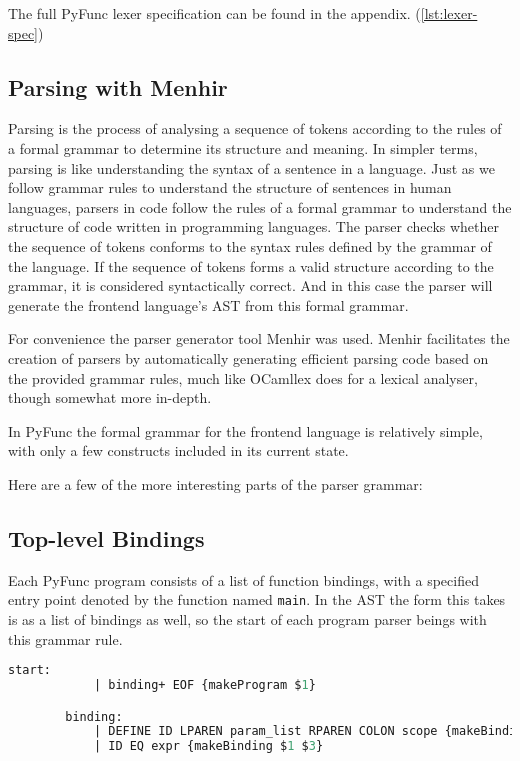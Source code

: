 \documentclass{l4proj}
\begin{document}
The full PyFunc lexer specification can be found in the appendix. (\ref{lst:lexer-spec})


\subsection{Parsing with Menhir}

Parsing is the process of analysing a sequence of tokens according to the rules of a formal grammar to determine its structure and meaning.
In simpler terms, parsing is like understanding the syntax of a sentence in a language.
Just as we follow grammar rules to understand the structure of sentences in human languages, parsers in code follow the rules of a formal grammar to understand the structure of code written in programming languages.
The parser checks whether the sequence of tokens conforms to the syntax rules defined by the grammar of the language.
If the sequence of tokens forms a valid structure according to the grammar, it is considered syntactically correct.
And in this case the parser will generate the frontend language's AST from this formal grammar.

For convenience the parser generator tool Menhir was used.
Menhir facilitates the creation of parsers by automatically generating efficient parsing code based on the provided grammar rules, much like OCamllex does for a lexical analyser, though somewhat more in-depth.

In PyFunc the formal grammar for the frontend language is relatively simple, with only a few constructs included in its current state.

Here are a few of the more interesting parts of the parser grammar:

\subsection*{Top-level Bindings}
    
    Each PyFunc program consists of a list of function bindings, with a specified entry point denoted by the function named \texttt{main}.
    In the AST the form this takes is as a list of bindings as well, so the start of each program parser beings with this grammar rule.

    \begin{lstlisting}[language=Caml, caption=PyFunc Parser's starting rule grammar.]
        start:
            | binding+ EOF {makeProgram $1}

        binding:
            | DEFINE ID LPAREN param_list RPAREN COLON scope {makeBinding $2 (makeFunc $2 $4 $7)}
            | ID EQ expr {makeBinding $1 $3}

    \end{lstlisting}
\end{document}
